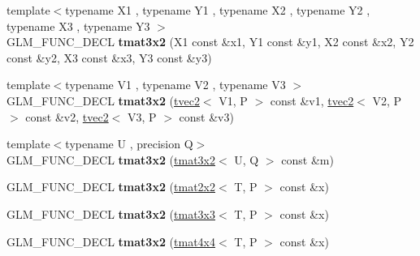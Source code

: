 \begin{DoxyCompactItemize}
\item 
\hypertarget{structglm_1_1detail_1_1tmat3x2_a775df36ef9146cd819095a1ffa971558}{{\footnotesize template$<$typename X1 , typename Y1 , typename X2 , typename Y2 , typename X3 , typename Y3 $>$ }\\G\-L\-M\-\_\-\-F\-U\-N\-C\-\_\-\-D\-E\-C\-L {\bfseries tmat3x2} (X1 const \&x1, Y1 const \&y1, X2 const \&x2, Y2 const \&y2, X3 const \&x3, Y3 const \&y3)}\label{structglm_1_1detail_1_1tmat3x2_a775df36ef9146cd819095a1ffa971558}

\item 
\hypertarget{structglm_1_1detail_1_1tmat3x2_af632d84043506726bd86e34fad3a532f}{{\footnotesize template$<$typename V1 , typename V2 , typename V3 $>$ }\\G\-L\-M\-\_\-\-F\-U\-N\-C\-\_\-\-D\-E\-C\-L {\bfseries tmat3x2} (\hyperlink{structglm_1_1detail_1_1tvec2}{tvec2}$<$ V1, P $>$ const \&v1, \hyperlink{structglm_1_1detail_1_1tvec2}{tvec2}$<$ V2, P $>$ const \&v2, \hyperlink{structglm_1_1detail_1_1tvec2}{tvec2}$<$ V3, P $>$ const \&v3)}\label{structglm_1_1detail_1_1tmat3x2_af632d84043506726bd86e34fad3a532f}

\item 
\hypertarget{structglm_1_1detail_1_1tmat3x2_ad2448500048ef60090e4d44bedd5868c}{{\footnotesize template$<$typename U , precision Q$>$ }\\G\-L\-M\-\_\-\-F\-U\-N\-C\-\_\-\-D\-E\-C\-L {\bfseries tmat3x2} (\hyperlink{structglm_1_1detail_1_1tmat3x2}{tmat3x2}$<$ U, Q $>$ const \&m)}\label{structglm_1_1detail_1_1tmat3x2_ad2448500048ef60090e4d44bedd5868c}

\item 
\hypertarget{structglm_1_1detail_1_1tmat3x2_abf0450ece5ddcb211561d3e8f2ef80d4}{G\-L\-M\-\_\-\-F\-U\-N\-C\-\_\-\-D\-E\-C\-L {\bfseries tmat3x2} (\hyperlink{structglm_1_1detail_1_1tmat2x2}{tmat2x2}$<$ T, P $>$ const \&x)}\label{structglm_1_1detail_1_1tmat3x2_abf0450ece5ddcb211561d3e8f2ef80d4}

\item 
\hypertarget{structglm_1_1detail_1_1tmat3x2_ade7bd106866ef9d3333332d20a52153e}{G\-L\-M\-\_\-\-F\-U\-N\-C\-\_\-\-D\-E\-C\-L {\bfseries tmat3x2} (\hyperlink{structglm_1_1detail_1_1tmat3x3}{tmat3x3}$<$ T, P $>$ const \&x)}\label{structglm_1_1detail_1_1tmat3x2_ade7bd106866ef9d3333332d20a52153e}

\item 
\hypertarget{structglm_1_1detail_1_1tmat3x2_a58d20ac5dcb7504ec91670e49e353f7b}{G\-L\-M\-\_\-\-F\-U\-N\-C\-\_\-\-D\-E\-C\-L {\bfseries tmat3x2} (\hyperlink{structglm_1_1detail_1_1tmat4x4}{tmat4x4}$<$ T, P $>$ const \&x)}\label{structglm_1_1detail_1_1tmat3x2_a58d20ac5dcb7504ec91670e49e353f7b}


\end{DoxyCompactItemize}
